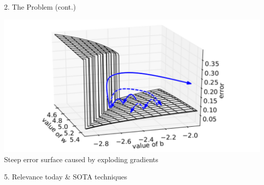 \begin{frame}[t]
\begin{columns}[t,totalwidth=\textwidth]
\begin{column}{0.3\textwidth}
\begin{block}{2. The Problem (cont.)}
    \begin{center}
        \includegraphics[width=0.9\linewidth]{figures/geometric.png} \\
        \small Steep error surface caused by exploding gradients
    \end{center}

    \end{block}



    \begin{block}{5. Relevance today \& SOTA techniques}

 
        

\end{block}
\end{column}
\end{columns}
\end{frame}
